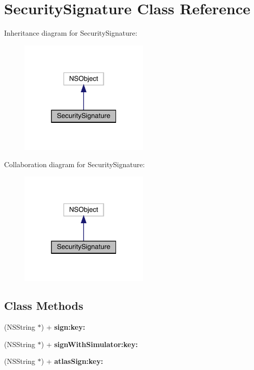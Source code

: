 \hypertarget{interface_security_signature}{}\section{Security\+Signature Class Reference}
\label{interface_security_signature}


Inheritance diagram for Security\+Signature\+:\nopagebreak
\begin{figure}[H]
\begin{center}
\leavevmode
\includegraphics[width=175pt]{interface_security_signature__inherit__graph}
\end{center}
\end{figure}


Collaboration diagram for Security\+Signature\+:\nopagebreak
\begin{figure}[H]
\begin{center}
\leavevmode
\includegraphics[width=175pt]{interface_security_signature__coll__graph}
\end{center}
\end{figure}
\subsection*{Class Methods}
\begin{DoxyCompactItemize}
\item 
\mbox{\label{interface_security_signature_a5a2bcf848fa08ebe9eba106a216d4bf1}} 
(N\+S\+String $\ast$) + {\bfseries sign\+:key\+:}
\item 
\mbox{\label{interface_security_signature_a9f75676574da7b18599f118293299f55}} 
(N\+S\+String $\ast$) + {\bfseries sign\+With\+Simulator\+:key\+:}
\item 
\mbox{\label{interface_security_signature_a294eedb82db28d14d0f2f3194938aed2}} 
(N\+S\+String $\ast$) + {\bfseries atlas\+Sign\+:key\+:}
\end{DoxyCompactItemize}


